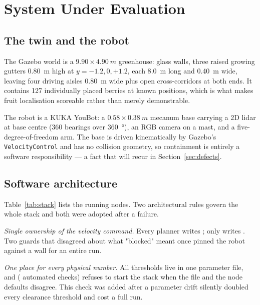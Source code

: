 \documentclass[conference]{IEEEtran}
\begin{document}
\section{System Under Evaluation}

\subsection{The twin and the robot}

The Gazebo world is a $9.90 \times \SI{4.90}{m}$ greenhouse: glass walls, three
raised growing gutters \SI{0.80}{m} high at $y = -1.2, 0, +1.2$, each
\SI{8.0}{m} long and \SI{0.40}{m} wide, leaving four driving aisles
\SI{0.80}{m} wide plus open cross-corridors at both ends. It contains 127
individually placed berries at known positions, which is what makes fruit
localisation scoreable rather than merely demonstrable.

The robot is a KUKA YouBot: a $0.58 \times \SI{0.38}{m}$ mecanum base
\cite{ilon1975wheel} carrying a 2D lidar at base centre (360 bearings over
\SI{360}{\degree}), an RGB camera on a mast, and a five-degree-of-freedom arm.
The base is driven kinematically by Gazebo's \texttt{VelocityControl} and has
no collision geometry, so containment is entirely a software responsibility ---
a fact that will recur in Section~\ref{sec:defects}.

\subsection{Software architecture}

Table~\ref{tab:stack} lists the running nodes. Two architectural rules govern
the whole stack and both were adopted after a failure.

\emph{Single ownership of the velocity command.} Every planner writes
; only  writes
. Two guards that disagreed about what "blocked" meant once
pinned the robot against a wall for an entire run.

\emph{One place for every physical number.} All thresholds live in one
parameter file, and  (
automated checks) refuses to start the stack when the file and the node
defaults disagree. This check was added after a parameter drift silently
doubled every clearance threshold and cost a full run.
\end{document}
